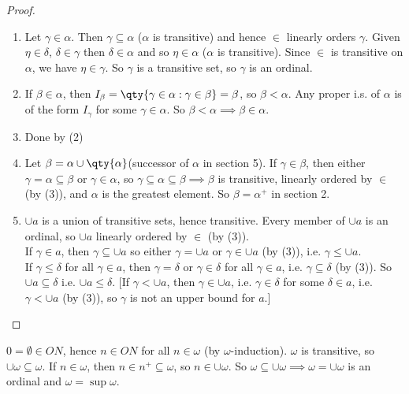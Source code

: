 \begin{proof}
    \begin{enumerate}
        \item Let $\gamma \in \alpha$.
        Then $\gamma \subseteq \alpha$ ($\alpha$ is transitive) and hence $\in$ linearly orders $\gamma$.
        Given $\eta \in \delta$, $\delta \in \gamma$ then $\delta \in \alpha$ and so $\eta \in \alpha$ ($\alpha$ is transitive).
        Since $\in$ is transitive on $\alpha$, we have $\eta \in \gamma$.
        So $\gamma$ is a transitive set, so $\gamma$ is an ordinal.
        \item If $\beta \in \alpha$, then $I_\beta = \qty{\gamma \in \alpha : \gamma \in \beta} = \beta$, so $\beta < \alpha$.
        Any proper i.s. of $\alpha$ is of the form $I_\gamma$ for some $\gamma \in \alpha$.
        So $\beta < \alpha \implies \beta \in \alpha$.
        \item Done by (2)
        \item Let $\beta = \alpha \cup \qty{\alpha}$(successor of $\alpha$ in section 5).
        If $\gamma \in \beta$, then either $\gamma = \alpha \subseteq \beta$ or $\gamma \in \alpha$, so $\gamma \subseteq \alpha \subseteq \beta \implies \beta$ is transitive, linearly ordered by $\in$ (by (3)), and $\alpha$ is the greatest element.
        So $\beta = \alpha^+$ in section 2.
        \item $\cup a$ is a union of transitive sets, hence transitive.
        Every member of $\cup a$ is an ordinal, so $\cup a$ linearly ordered by $\in$ (by (3)). \\
        If $\gamma \in a$, then $\gamma \subseteq \cup a$ so either $\gamma = \cup a$ or $\gamma \in \cup a$ (by (3)), i.e. $\gamma \leq \cup a$. \\
        If $\gamma \leq \delta$ for all $\gamma \in a$, then $\gamma = \delta$ or $\gamma \in \delta$ for all $\gamma \in a$, i.e. $\gamma \subseteq \delta$ (by (3)).
        So $\cup a \subseteq \delta$ i.e. $\cup a \leq \delta$.
        [If $\gamma < \cup a$, then $\gamma \in \cup a$, i.e. $\gamma \in \delta$ for some $\delta \in a$, i.e. $\gamma < \cup a$ (by (3)), so $\gamma$ is not an upper bound for $a$.]
    \end{enumerate}
\end{proof}

\begin{example}
    $0 = \emptyset \in ON$, hence $n \in ON$ for all $n \in \omega$ (by $\omega$-induction).
    $\omega$ is transitive, so $\cup \omega \subseteq \omega$.
    If $n \in \omega$, then $n \in n^+ \subseteq \omega$, so $n \in \cup \omega$.
    So $\omega \subseteq \cup \omega \implies \omega = \cup \omega$ is an ordinal and $\omega = \sup \omega$.
\end{example}

